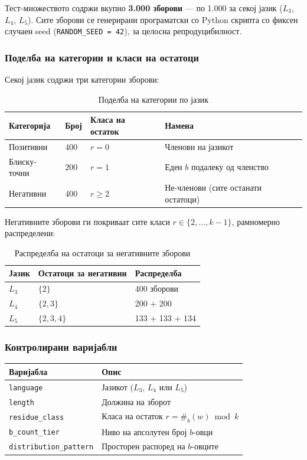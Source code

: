 \documentclass[12pt,a4paper]{article}
\theoremstyle{definition}
\begin{document}
Тест-множеството содржи вкупно \textbf{3.000 зборови} --- по 1.000 за секој јазик ($L_3$, $L_4$, $L_5$). Сите зборови се генерирани програматски со Python скрипта со фиксен случаен seed (\texttt{RANDOM\_SEED = 42}), за целосна репродуцибилност.

\subsubsection{Поделба на категории и класи на остатоци}

Секој јазик содржи три категории зборови:

\begin{table}[H]
\centering
\begin{tabular}{llll}
\toprule
\textbf{Категорија} & \textbf{Број} & \textbf{Класа на остаток} & \textbf{Намена} \\
\midrule
Позитивни   & 400 & $r=0$ & Членови на јазикот \\
Блиску-точни & 200 & $r=1$ & Еден $b$ подалеку од членство \\
Негативни   & 400 & $r \geq 2$ & Не-членови (сите останати остатоци) \\
\bottomrule
\end{tabular}
\caption{Поделба на категории по јазик}
\end{table}

Негативните зборови ги покриваат сите класи $r\in\{2,\ldots,k-1\}$, рамномерно распределени:

\begin{table}[H]
\centering
\begin{tabular}{lll}
\toprule
\textbf{Јазик} & \textbf{Остатоци за негативни} & \textbf{Распределба} \\
\midrule
$L_3$ & $\{2\}$ & 400 зборови \\
$L_4$ & $\{2, 3\}$ & 200 + 200 \\
$L_5$ & $\{2, 3, 4\}$ & 133 + 133 + 134 \\
\bottomrule
\end{tabular}
\caption{Распределба на остатоци за негативните зборови}
\end{table}

\subsubsection{Контролирани варијабли}

\begin{table}[H]
\centering
\begin{tabular}{ll}
\toprule
\textbf{Варијабла} & \textbf{Опис} \\
\midrule
\texttt{language} & Јазикот ($L_3$, $L_4$ или $L_5$) \\
\texttt{length} & Должина на зборот \\
\texttt{residue\_class} & Класа на остаток $r = \#_b(w) \bmod k$ \\
\texttt{b\_count\_tier} & Ниво на апсолутен број $b$-овци \\
\texttt{distribution\_pattern} & Просторен распоред на $b$-овците \\
\bottomrule
\end{tabular}
\end{table}
\end{document}
